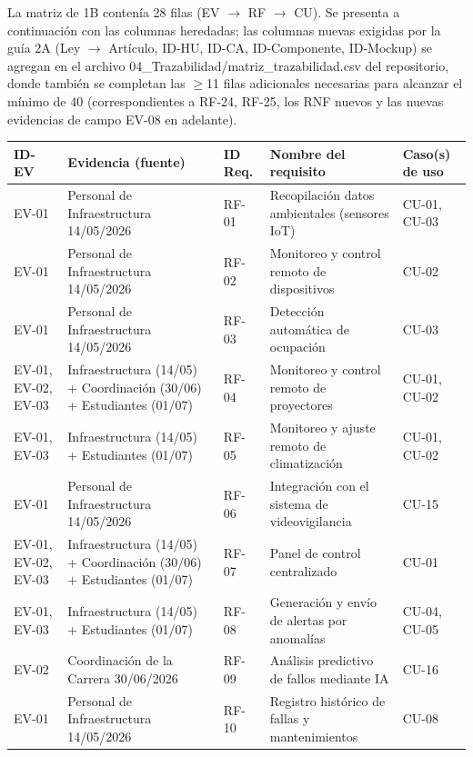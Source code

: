 
La matriz de 1B contenía 28 filas (EV $\rightarrow$ RF $\rightarrow$ CU). Se presenta a continuación con las columnas heredadas; las columnas nuevas exigidas por la guía 2A (Ley $\rightarrow$ Artículo, ID-HU, ID-CA, ID-Componente, ID-Mockup) se agregan en el archivo 04\_Trazabilidad/matriz\_trazabilidad.csv del repositorio, donde también se completan las $\geq$11 filas adicionales necesarias para alcanzar el mínimo de 40 (correspondientes a RF-24, RF-25, los RNF nuevos y las nuevas evidencias de campo EV-08 en adelante).


\begingroup
\small
\begin{longtable}{|P{0.2000}|P{0.2000}|P{0.2000}|P{0.2000}|P{0.2000}|}
\hline
ID-EV & Evidencia (fuente) & ID Req. & Nombre del requisito & Caso(s) de uso \\ \hline
EV-01 & Personal de Infraestructura 14/05/2026 & RF-01 & Recopilación datos ambientales (sensores IoT) & CU-01, CU-03 \\ \hline
EV-01 & Personal de Infraestructura 14/05/2026 & RF-02 & Monitoreo y control remoto de dispositivos & CU-02 \\ \hline
EV-01 & Personal de Infraestructura 14/05/2026 & RF-03 & Detección automática de ocupación & CU-03 \\ \hline
EV-01, EV-02, EV-03 & Infraestructura (14/05) + Coordinación (30/06) + Estudiantes (01/07) & RF-04 & Monitoreo y control remoto de proyectores & CU-01, CU-02 \\ \hline
EV-01, EV-03 & Infraestructura (14/05) + Estudiantes (01/07) & RF-05 & Monitoreo y ajuste remoto de climatización & CU-01, CU-02 \\ \hline
EV-01 & Personal de Infraestructura 14/05/2026 & RF-06 & Integración con el sistema de videovigilancia & CU-15 \\ \hline
EV-01, EV-02, EV-03 & Infraestructura (14/05) + Coordinación (30/06) + Estudiantes (01/07) & RF-07 & Panel de control centralizado & CU-01 \\ \hline
EV-01, EV-03 & Infraestructura (14/05) + Estudiantes (01/07) & RF-08 & Generación y envío de alertas por anomalías & CU-04, CU-05 \\ \hline
EV-02 & Coordinación de la Carrera 30/06/2026 & RF-09 & Análisis predictivo de fallos mediante IA & CU-16 \\ \hline
EV-01 & Personal de Infraestructura 14/05/2026 & RF-10 & Registro histórico de fallas y mantenimientos & CU-08 \\ \hline

\end{longtable}
